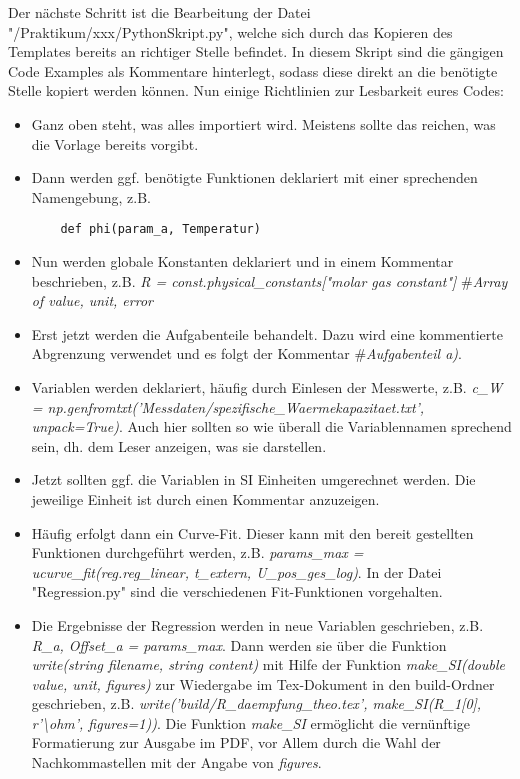 Der nächste Schritt ist die Bearbeitung der Datei "/Praktikum/xxx/PythonSkript.py", welche sich durch das Kopieren des Templates bereits an richtiger Stelle befindet. In diesem Skript sind die gängigen Code Examples als Kommentare hinterlegt, sodass diese direkt an die benötigte Stelle kopiert werden können. Nun einige Richtlinien zur Lesbarkeit eures Codes:
\begin{itemize}
  \item Ganz oben steht, was alles importiert wird. Meistens sollte das reichen, was die Vorlage bereits vorgibt.
  \item Dann werden ggf. benötigte Funktionen deklariert mit einer sprechenden Namengebung, z.B.
  \begin{lstlisting}
    def phi(param_a, Temperatur)
  \end{lstlisting}
  \item Nun werden globale Konstanten deklariert und in einem Kommentar beschrieben, z.B. \emph{R = const.physical\_constants["molar gas constant"]} \#\emph{Array of value, unit, error}
  \item Erst jetzt werden die Aufgabenteile behandelt. Dazu wird eine kommentierte Abgrenzung verwendet und es folgt der Kommentar \#\emph{Aufgabenteil a)}.
  \item Variablen werden deklariert, häufig durch Einlesen der Messwerte, z.B. \emph{c\_W = np.genfromtxt('Messdaten/spezifische\_Waermekapazitaet.txt', unpack=True)}. Auch hier sollten so wie überall die Variablennamen sprechend sein, dh. dem Leser anzeigen, was sie darstellen.
  \item Jetzt sollten ggf. die Variablen in SI Einheiten umgerechnet werden. Die jeweilige Einheit ist durch einen Kommentar anzuzeigen.
  \item Häufig erfolgt dann ein Curve-Fit. Dieser kann mit den bereit gestellten Funktionen durchgeführt werden, z.B. \emph{params\_max = ucurve\_fit(reg.reg\_linear, t\_extern, U\_pos\_ges\_log)}. In der Datei "Regression.py" sind die verschiedenen Fit-Funktionen vorgehalten.
  \item Die Ergebnisse der Regression werden in neue Variablen geschrieben, z.B. \emph{R\_a, Offset\_a = params\_max}. Dann werden sie über die Funktion \emph{write(string filename, string content)} mit Hilfe der Funktion \emph{make\_SI(double value, unit, figures)} zur Wiedergabe im Tex-Dokument in den build-Ordner geschrieben, z.B. \emph{write('build/R\_daempfung\_theo.tex', make\_SI(R\_1[0], r'\textbackslash ohm', figures=1))}. Die Funktion \emph{make\_SI} ermöglicht die vernünftige Formatierung zur Ausgabe im PDF, vor Allem durch die Wahl der Nachkommastellen mit der Angabe von \emph{figures}.

\end{itemize}

